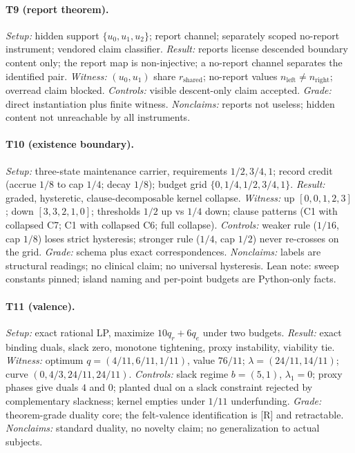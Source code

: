 \documentclass[11pt]{article}
\newcommand{\gradeR}{\textsf{[R]}}
\theoremstyle{definition}
\begin{document}
\paragraph{T9 (report theorem).}
\emph{Setup:} hidden support $\{u_0, u_1, u_2\}$; report channel; separately
scoped no-report instrument; vendored claim classifier. \emph{Result:}
reports license descended boundary content only; the report map is
non-injective; a no-report channel separates the identified pair.
\emph{Witness:} $(u_0, u_1)$ share $r_\mathrm{shared}$; no-report values
$n_\mathrm{left} \neq n_\mathrm{right}$; overread claim blocked.
\emph{Controls:} visible descent-only claim accepted. \emph{Grade:} direct
instantiation plus finite witness. \emph{Nonclaims:} reports not useless;
hidden content not unreachable by all instruments.

\paragraph{T10 (existence boundary).}
\emph{Setup:} three-state maintenance carrier, requirements $1/2, 3/4, 1$;
record credit (accrue $1/8$ to cap $1/4$; decay $1/8$); budget grid
$\{0, 1/4, 1/2, 3/4, 1\}$. \emph{Result:} graded, hysteretic,
clause-decomposable kernel collapse. \emph{Witness:} up $[0,0,1,2,3]$; down
$[3,3,2,1,0]$; thresholds $1/2$ up vs $1/4$ down; clause patterns
(C1 with collapsed C7; C1 with collapsed C6; full collapse).
\emph{Controls:} weaker rule ($1/16$, cap $1/8$) loses strict hysteresis;
stronger rule ($1/4$, cap $1/2$) never re-crosses on the grid.
\emph{Grade:} schema plus exact correspondences. \emph{Nonclaims:} labels
are structural readings; no clinical claim; no universal hysteresis. Lean
note: sweep constants pinned; island naming and per-point budgets are
Python-only facts.

\paragraph{T11 (valence).}
\emph{Setup:} exact rational LP, maximize $10q_r + 6q_e$ under two budgets.
\emph{Result:} exact binding duals, slack zero, monotone tightening, proxy
instability, viability tie. \emph{Witness:} optimum $q = (4/11, 6/11, 1/11)$,
value $76/11$; $\lambda = (24/11, 14/11)$; curve $(0, 4/3, 24/11, 24/11)$.
\emph{Controls:} slack regime $b = (5,1)$, $\lambda_1 = 0$; proxy phases give
duals $4$ and $0$; planted dual on a slack constraint rejected by
complementary slackness; kernel empties under $1/11$ underfunding.
\emph{Grade:} theorem-grade duality core; the felt-valence identification is
\gradeR{} and retractable. \emph{Nonclaims:} standard duality, no novelty
claim; no generalization to actual subjects.
\end{document}
